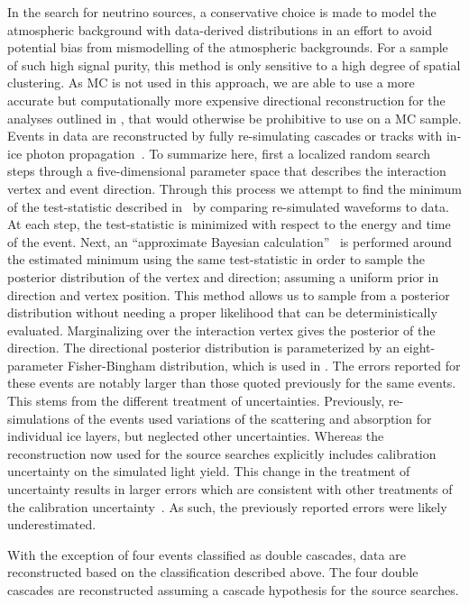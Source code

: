 In the search for neutrino sources, a conservative choice is made to model the atmospheric background with data-derived distributions in an effort to avoid potential bias from mismodelling of the atmospheric backgrounds.
For a sample of such high signal purity, this method is only sensitive to a high degree of spatial clustering.
As MC is not used in this approach, we are able to use a more accurate but computationally more expensive directional reconstruction for the analyses outlined in , that would otherwise be prohibitive to use on a MC sample.
Events in data are reconstructed by fully re-simulating cascades or tracks with in-ice photon propagation~\cite{Chirkin:2013dfi}.
To summarize here, first a localized random search steps through a five-dimensional parameter space that describes the interaction vertex and event direction.
Through this process we attempt to find the minimum of the test-statistic described in~\cite{Chirkin:2013lya} by comparing re-simulated waveforms to data.
At each step, the test-statistic is minimized with respect to the energy and time of the event.
Next, an ``approximate Bayesian calculation''~\cite{Marjoram15324} is performed around the estimated minimum using the same test-statistic in order to sample the posterior distribution of the vertex and direction; assuming a uniform prior in direction and vertex position.
This method allows us to sample from a posterior distribution without needing a proper likelihood that can be deterministically evaluated.
Marginalizing over the interaction vertex gives the posterior of the direction. The directional posterior distribution is parameterized  by an eight-parameter Fisher-Bingham distribution, which is used in .
The errors reported for these events are notably larger than those quoted previously for the same events.
This stems from the different treatment of uncertainties.
Previously, re-simulations of the events used variations of the scattering and absorption for individual ice layers, but neglected other uncertainties.
Whereas the reconstruction now used for the source searches explicitly includes calibration uncertainty on the simulated light yield.
This change in the treatment of uncertainty results in larger errors which are consistent with other treatments of the calibration uncertainty~\cite{Aartsen:2019jcj}.
As such, the previously reported errors were likely underestimated.

With the exception of four events classified as double cascades, data are reconstructed based on the classification described above.
The four double cascades are reconstructed assuming a cascade hypothesis for the source searches.

